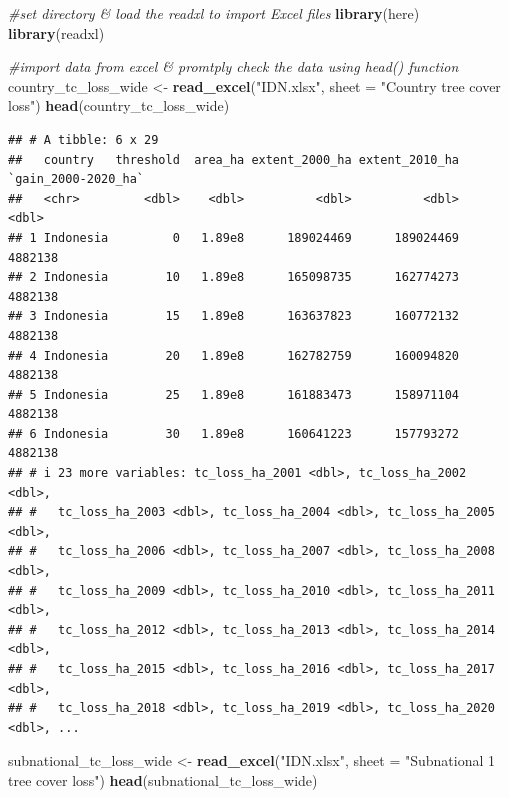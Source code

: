 \documentclass[
]{article}
\newenvironment{Shaded}{\begin{snugshade}}{\end{snugshade}}
\newcommand{\AttributeTok}[1]{\textcolor[rgb]{0.13,0.29,0.53}{#1}}
\newcommand{\CommentTok}[1]{\textcolor[rgb]{0.56,0.35,0.01}{\textit{#1}}}
\newcommand{\FunctionTok}[1]{\textcolor[rgb]{0.13,0.29,0.53}{\textbf{#1}}}
\newcommand{\NormalTok}[1]{#1}
\newcommand{\OtherTok}[1]{\textcolor[rgb]{0.56,0.35,0.01}{#1}}
\newcommand{\StringTok}[1]{\textcolor[rgb]{0.31,0.60,0.02}{#1}}
\begin{document}
\begin{Shaded}
\begin{Highlighting}[]
\CommentTok{\#set directory \& load the readxl to import Excel files}
\FunctionTok{library}\NormalTok{(here)}
\FunctionTok{library}\NormalTok{(readxl)}


\CommentTok{\#import data from excel \& promtply check the data using head() function}
\NormalTok{country\_tc\_loss\_wide }\OtherTok{\textless{}{-}} \FunctionTok{read\_excel}\NormalTok{(}\StringTok{"IDN.xlsx"}\NormalTok{, }\AttributeTok{sheet =} \StringTok{"Country tree cover loss"}\NormalTok{)}
\FunctionTok{head}\NormalTok{(country\_tc\_loss\_wide)}
\end{Highlighting}
\end{Shaded}

\begin{verbatim}
## # A tibble: 6 x 29
##   country   threshold  area_ha extent_2000_ha extent_2010_ha `gain_2000-2020_ha`
##   <chr>         <dbl>    <dbl>          <dbl>          <dbl>               <dbl>
## 1 Indonesia         0   1.89e8      189024469      189024469             4882138
## 2 Indonesia        10   1.89e8      165098735      162774273             4882138
## 3 Indonesia        15   1.89e8      163637823      160772132             4882138
## 4 Indonesia        20   1.89e8      162782759      160094820             4882138
## 5 Indonesia        25   1.89e8      161883473      158971104             4882138
## 6 Indonesia        30   1.89e8      160641223      157793272             4882138
## # i 23 more variables: tc_loss_ha_2001 <dbl>, tc_loss_ha_2002 <dbl>,
## #   tc_loss_ha_2003 <dbl>, tc_loss_ha_2004 <dbl>, tc_loss_ha_2005 <dbl>,
## #   tc_loss_ha_2006 <dbl>, tc_loss_ha_2007 <dbl>, tc_loss_ha_2008 <dbl>,
## #   tc_loss_ha_2009 <dbl>, tc_loss_ha_2010 <dbl>, tc_loss_ha_2011 <dbl>,
## #   tc_loss_ha_2012 <dbl>, tc_loss_ha_2013 <dbl>, tc_loss_ha_2014 <dbl>,
## #   tc_loss_ha_2015 <dbl>, tc_loss_ha_2016 <dbl>, tc_loss_ha_2017 <dbl>,
## #   tc_loss_ha_2018 <dbl>, tc_loss_ha_2019 <dbl>, tc_loss_ha_2020 <dbl>, ...
\end{verbatim}

\begin{Shaded}
\begin{Highlighting}[]
\NormalTok{subnational\_tc\_loss\_wide }\OtherTok{\textless{}{-}} \FunctionTok{read\_excel}\NormalTok{(}\StringTok{"IDN.xlsx"}\NormalTok{, }\AttributeTok{sheet =} \StringTok{"Subnational 1 tree cover loss"}\NormalTok{)}
\FunctionTok{head}\NormalTok{(subnational\_tc\_loss\_wide)}
\end{Highlighting}
\end{Shaded}
\end{document}
